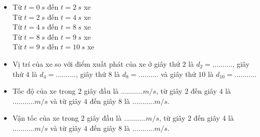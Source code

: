 \begin{vidu}
\begin{itemize}
\item[a)] Từ $t=0\ s$ đến $t=2\ s$ xe \dotfill\\
Từ $t=2\ s$ đến $t=4\ s$ xe \dotfill\\
Từ $t=4\ s$ đến $t=8\ s$ xe \dotfill\\
Từ $t=8\ s$ đến $t=9\ s$ xe \dotfill\\
Từ $t=9\ s$ đến $t=10\ s$ xe \dotfill
\item[b)] Vị trí của xe so với điểm xuất phát của xe ở giây thứ $2$ là $d_2=..........$, giây thứ $4$ là  $d_4=..........$, giây thứ $8$ là  $d_8=..........$ và giây thứ $10$ là  $d_{10}=..........$.
\item[c)] Tốc độ của xe trong $2$ giây đầu là $........... m/s$, từ giây $2$ đến giây $4$  là $........... m/s$ và từ giây $4$ đến giây $8$  là $........... m/s$.
\item[d)] Vận tốc của xe trong $2$ giây đầu là $........... m/s$, từ giây $2$ đến giây $4$  là $........... m/s$ và từ giây $4$ đến giây $8$  là $........... m/s$.


\end{itemize}
\end{vidu}
